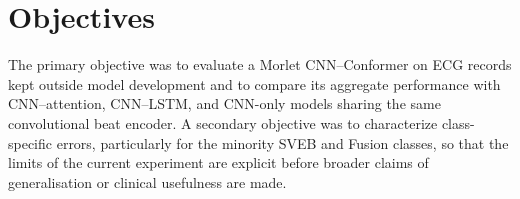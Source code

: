 \section{Objectives}

The primary objective was to evaluate a Morlet CNN--Conformer on ECG records kept outside model development and to compare its aggregate performance with CNN--attention, CNN--LSTM, and CNN-only models sharing the same convolutional beat encoder. A secondary objective was to characterize class-specific errors, particularly for the minority SVEB and Fusion classes, so that the limits of the current experiment are explicit before broader claims of generalisation or clinical usefulness are made.
